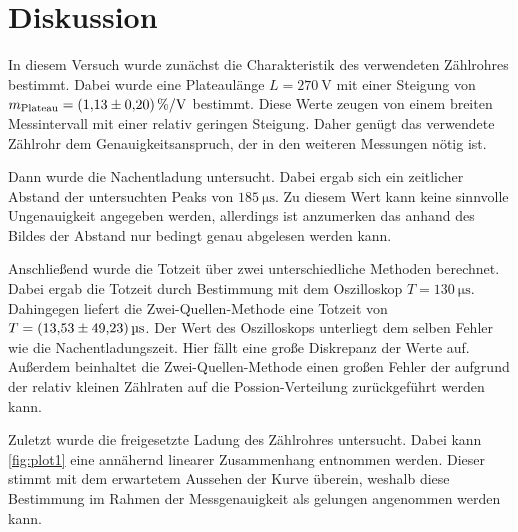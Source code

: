 \section{Diskussion}
\label{sec:Diskussion}
In diesem Versuch wurde zunächst die Charakteristik des verwendeten Zählrohres bestimmt. Dabei wurde eine Plateaulänge $L = \qty{270}{\volt}$ mit einer Steigung von 
$m_\text{Plateau} = \qty{1.13+-0.20}{\percent\per\volt}$ bestimmt. Diese Werte zeugen von einem breiten Messintervall mit einer relativ geringen Steigung. Daher genügt das verwendete 
Zählrohr dem Genauigkeitsanspruch, der in den weiteren Messungen nötig ist.

Dann wurde die Nachentladung untersucht. Dabei ergab sich ein zeitlicher Abstand der untersuchten Peaks von $\qty{185}{\micro\second}$. Zu diesem Wert kann keine sinnvolle
Ungenauigkeit angegeben werden, allerdings ist anzumerken das anhand des Bildes der Abstand nur bedingt genau abgelesen werden kann.  

Anschließend wurde die Totzeit über zwei unterschiedliche Methoden berechnet. Dabei ergab die Totzeit durch Bestimmung mit dem Oszilloskop $T = \qty{130}{\micro\second}$. Dahingegen
liefert die Zwei-Quellen-Methode eine Totzeit von $T = \qty{13.53 +-49.23}{\micro\second}$. Der Wert des Oszilloskops unterliegt dem selben Fehler wie die Nachentladungszeit.
Hier fällt eine große Diskrepanz der Werte auf. Außerdem beinhaltet die Zwei-Quellen-Methode einen großen Fehler der aufgrund der relativ kleinen Zählraten auf die 
Possion-Verteilung zurückgeführt werden kann.

Zuletzt wurde die freigesetzte Ladung des Zählrohres untersucht. Dabei kann \autoref{fig:plot1} eine annähernd linearer Zusammenhang entnommen werden. Dieser stimmt mit 
dem erwartetem Aussehen der Kurve überein, weshalb diese Bestimmung im Rahmen der Messgenauigkeit als gelungen angenommen werden kann.
